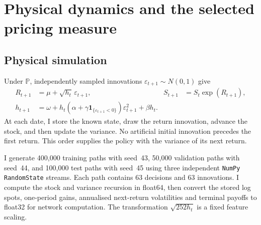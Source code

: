 \documentclass[11pt,a4paper]{article}
\newcommand{\Pp}{\mathbb P}
\newcommand{\ind}{\mathbf 1}
\theoremstyle{remark}
\begin{document}
\section{Physical dynamics and the selected pricing measure}
\subsection{Physical simulation}
Under $\Pp$, independently sampled innovations $\varepsilon_{t+1}\sim N(0,1)$ give
\begin{align}
 R_{t+1}&=\mu+\sqrt{h_t}\,\varepsilon_{t+1}, &
 S_{t+1}&=S_t\exp(R_{t+1}),\label{eq:physicalstock}\\
 h_{t+1}&=\omega+h_t(\alpha+\gamma\ind_{\{\varepsilon_{t+1}<0\}})
                           \varepsilon_{t+1}^2+\beta h_t.
 \label{eq:physicalvariance}
\end{align}
At each date, I store the known state, draw the return innovation, advance the stock, and then update the variance. No artificial initial innovation precedes the first return. This order supplies the policy with the variance of its next return.

I generate 400,000 training paths with seed~43, 50,000 validation paths with seed~44, and 100,000 test paths with seed~45 using three independent \texttt{NumPy RandomState} streams. Each path contains 63 decisions and 63 innovations. I compute the stock and variance recursion in float64, then convert the stored log spots, one-period gains, annualised next-return volatilities and terminal payoffs to float32 for network computation. The transformation $\sqrt{252h_t}$ is a fixed feature scaling.
\end{document}
